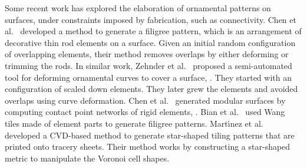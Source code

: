 Some recent work has explored the elaboration of ornamental
patterns on surfaces, under constraints imposed by fabrication, such as connectivity.  
Chen et al.~\cite{Chen2016} developed a method to generate a filigree pattern,
which is an arrangement of decorative thin rod elements on a surface.
Given an initial random configuration of overlapping elements, their method
removes overlaps by either deforming or trimming the rods.
In similar work, Zehnder et al.~\cite{Zehnder2016} 
proposed a semi-automated tool for deforming ornamental curves to cover a surface, . 
They started with an  configuration of scaled down elements. 
They later grew the elements and avoided overlaps using curve deformation.
Chen et al.~\cite{Chen2017} generated modular surfaces by
computing contact point networks of rigid elements, .
Bian et al.~\cite{Bian2018} used Wang tiles made of element parts to generate filigree patterns.
Mart\'{\i}nez et al.~\cite{Martinez2019} developed a CVD-based method to generate
star-shaped tiling patterns that are printed onto tracery sheets.
Their method works by constructing a star-shaped metric to manipulate the Voronoi cell shapes. 



